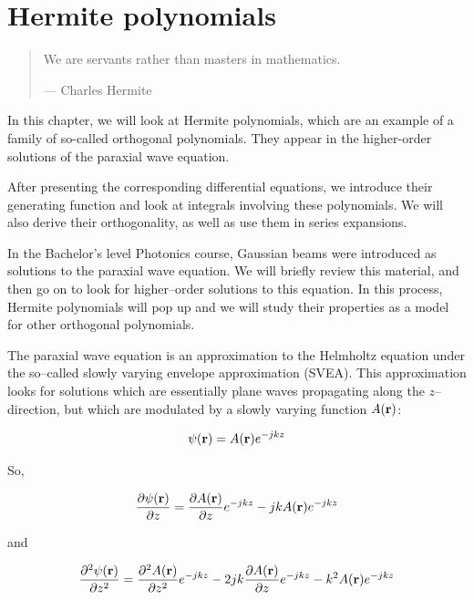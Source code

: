 \chapter{Hermite polynomials}
\label{h:hermite}

\begin{quote}
We are servants rather than masters in mathematics.

--- Charles Hermite
\end{quote}

\chaptertoc

In this chapter, we will look at Hermite polynomials, which are an example of a family of so-called orthogonal polynomials. They appear in the higher-order solutions of the paraxial wave equation.

After presenting the corresponding differential equations, we introduce their generating function and look at integrals involving these polynomials. We will also derive their orthogonality, as well as use them in series expansions.

\pagebreak


In the Bachelor's level Photonics course, Gaussian beams were introduced as solutions to the paraxial wave equation. We will briefly review this material, and then go on to look for higher--order solutions to this equation. In this process, Hermite polynomials will pop up and we will study their properties as a model for other orthogonal polynomials.

The paraxial wave equation is an approximation to the Helmholtz equation under the so--called slowly varying envelope approximation (SVEA). This approximation looks for solutions which are essentially plane waves propagating along the $z$--direction, but which are modulated by a slowly varying function $A({\bf r})$:

\begin{equation}
\psi({\bf r}) = A({\bf r})e^{-jkz}
\end{equation} 

So,

\begin{equation}
\frac{\partial \psi({\bf r})}{\partial z} = \frac {\partial A({\bf r})}{\partial z}e^{-jkz} -j k A({\bf r})e^{-jkz}
\end{equation} 

and

\begin{equation}
\frac{\partial^2 \psi({\bf r})}{\partial z^2} = \frac{\partial^2 A({\bf r})}{\partial z^2}e^{-jkz} - 2 j k \frac{\partial A({\bf r})}{\partial z}e^{-jkz} - k^2 A({\bf r})e^{-jkz}
\end{equation} 

